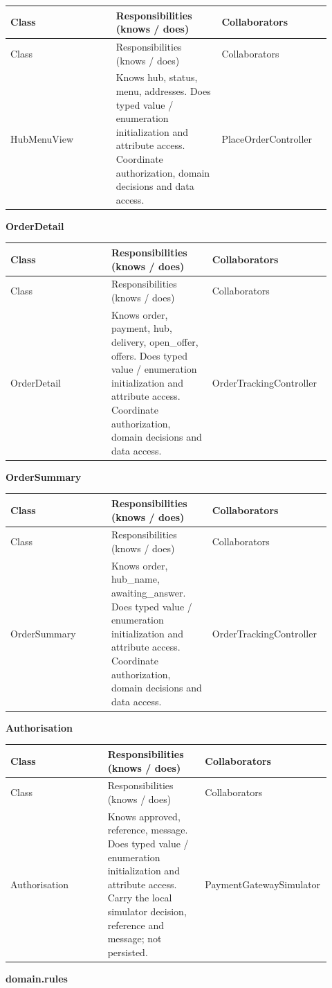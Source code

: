 \begin{longtable}{>{\raggedright\arraybackslash}p{0.3067\linewidth}>{\raggedright\arraybackslash}p{0.3067\linewidth}>{\raggedright\arraybackslash}p{0.3067\linewidth}}
Class & Responsibilities (knows / does) & Collaborators \\
\hline\endfirsthead
Class & Responsibilities (knows / does) & Collaborators \\
\hline\endhead
HubMenuView & Knows hub, status, menu, addresses. Does typed value / enumeration initialization and attribute access. Coordinate authorization, domain decisions and data access. & PlaceOrderController \\
\end{longtable}
\textbf{OrderDetail}

\begin{longtable}{>{\raggedright\arraybackslash}p{0.3067\linewidth}>{\raggedright\arraybackslash}p{0.3067\linewidth}>{\raggedright\arraybackslash}p{0.3067\linewidth}}
Class & Responsibilities (knows / does) & Collaborators \\
\hline\endfirsthead
Class & Responsibilities (knows / does) & Collaborators \\
\hline\endhead
OrderDetail & Knows order, payment, hub, delivery, open\_offer, offers. Does typed value / enumeration initialization and attribute access. Coordinate authorization, domain decisions and data access. & OrderTrackingController \\
\end{longtable}
\textbf{OrderSummary}

\begin{longtable}{>{\raggedright\arraybackslash}p{0.3067\linewidth}>{\raggedright\arraybackslash}p{0.3067\linewidth}>{\raggedright\arraybackslash}p{0.3067\linewidth}}
Class & Responsibilities (knows / does) & Collaborators \\
\hline\endfirsthead
Class & Responsibilities (knows / does) & Collaborators \\
\hline\endhead
OrderSummary & Knows order, hub\_name, awaiting\_answer. Does typed value / enumeration initialization and attribute access. Coordinate authorization, domain decisions and data access. & OrderTrackingController \\
\end{longtable}
\textbf{Authorisation}

\begin{longtable}{>{\raggedright\arraybackslash}p{0.3067\linewidth}>{\raggedright\arraybackslash}p{0.3067\linewidth}>{\raggedright\arraybackslash}p{0.3067\linewidth}}
Class & Responsibilities (knows / does) & Collaborators \\
\hline\endfirsthead
Class & Responsibilities (knows / does) & Collaborators \\
\hline\endhead
Authorisation & Knows approved, reference, message. Does typed value / enumeration initialization and attribute access. Carry the local simulator decision, reference and message; not persisted. & PaymentGatewaySimulator \\
\end{longtable}
\textbf{domain.rules}

